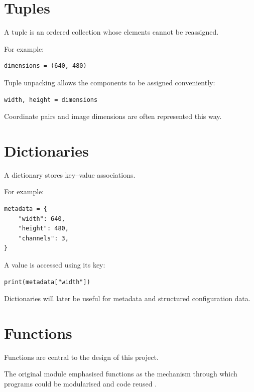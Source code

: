 \section{Tuples}
\label{sec:python-tuples}

A tuple is an ordered collection whose elements cannot be reassigned.

For example:

\begin{verbatim}
dimensions = (640, 480)
\end{verbatim}

Tuple unpacking allows the components to be assigned conveniently:

\begin{verbatim}
width, height = dimensions
\end{verbatim}

Coordinate pairs and image dimensions are often represented this way.


\section{Dictionaries}
\label{sec:python-dictionaries}

A dictionary stores key--value associations.

For example:

\begin{verbatim}
metadata = {
    "width": 640,
    "height": 480,
    "channels": 3,
}
\end{verbatim}

A value is accessed using its key:

\begin{verbatim}
print(metadata["width"])
\end{verbatim}

Dictionaries will later be useful for metadata and structured
configuration data.


\section{Functions}
\label{sec:python-functions}

Functions are central to the design of this project.

The original module emphasised functions as the mechanism through
which programs could be modularised and code reused
\cite{johnson_uqc146_intro}.

